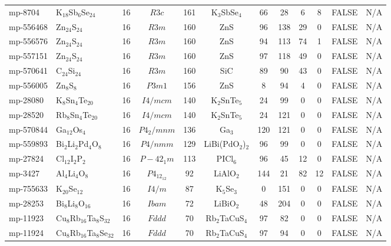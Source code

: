 {\begin{longtable}{llcccccccccc}
    mp-8704 & K$_{18}$Sb$_{6}$Se$_{24}$ & 16    & $R3c$ & 161   & K$_{3}$SbSe$_{4}$ & 66    & 28    & 6     & 8     & FALSE & N/A \\
    mp-556468 & Zn$_{24}$S$_{24}$ & 16    & $R3m$ & 160   & ZnS   & 96    & 138   & 29    & 0     & FALSE & N/A \\
    mp-556576 & Zn$_{24}$S$_{24}$ & 16    & $R3m$ & 160   & ZnS   & 94    & 113   & 74    & 1     & FALSE & N/A \\
    mp-557151 & Zn$_{24}$S$_{24}$ & 16    & $R3m$ & 160   & ZnS   & 97    & 118   & 49    & 0     & FALSE & N/A \\
    mp-570641 & C$_{24}$Si$_{24}$ & 16    & $R3m$ & 160   & SiC   & 89    & 90    & 43    & 0     & FALSE & N/A \\
    mp-556005 & Zn$_{8}$S$_{8}$ & 16    & $P3m1$ & 156   & ZnS   & 8     & 94    & 4     & 0     & FALSE & N/A \\
    mp-28080 & K$_{8}$Sn$_{4}$Te$_{20}$ & 16    & $I4/mcm$ & 140   & K$_{2}$SnTe$_{5}$ & 24    & 99    & 0     & 0     & FALSE & N/A \\
    mp-28520 & Rb$_{8}$Sn$_{4}$Te$_{20}$ & 16    & $I4/mcm$ & 140   & K$_{2}$SnTe$_{5}$ & 24    & 121   & 0     & 0     & FALSE & N/A \\
    mp-570844 & Ga$_{12}$Os$_{4}$ & 16    & $P4_2/mnm$ & 136   & Ga$_{3}$ & 120   & 121   & 0     & 0     & FALSE & N/A \\
    mp-559893 & Bi$_{2}$Li$_{2}$Pd$_{4}$O$_{8}$ & 16    & $P4/nmm$ & 129   & LiBi(PdO$_{2}$)$_{2}$ & 96    & 99    & 0     & 0     & FALSE & N/A \\
    mp-27824 & Cl$_{12}$I$_{2}$P$_{2}$ & 16    & $P-42_1m$ & 113   & PICl$_{6}$ & 96    & 45    & 12    & 0     & FALSE & N/A \\
    mp-3427 & Al$_{4}$Li$_{4}$O$_{8}$ & 16    & $P4_12_12$ & 92    & LiAlO$_{2}$ & 144   & 21    & 82    & 12    & FALSE & N/A \\
    mp-755633 & K$_{20}$Se$_{12}$ & 16    & $I4/m$ & 87    & K$_{5}$Se$_{3}$ & 0     & 151   & 0     & 0     & FALSE & N/A \\
    mp-28253 & Bi$_{8}$Li$_{8}$O$_{16}$ & 16    & $Ibam$ & 72    & LiBiO$_{2}$ & 48    & 204   & 0     & 0     & FALSE & N/A \\
    mp-11923 & Cu$_{8}$Rb$_{16}$Ta$_{8}$S$_{32}$ & 16    & $Fddd$ & 70    & Rb$_{2}$TaCuS$_{4}$ & 97    & 82    & 0     & 0     & FALSE & N/A \\
    mp-11924 & Cu$_{8}$Rb$_{16}$Ta$_{8}$Se$_{32}$ & 16    & $Fddd$ & 70    & Rb$_{2}$TaCuS$_{4}$ & 97    & 94    & 0     & 0     & FALSE & N/A \\

\end{longtable}}

